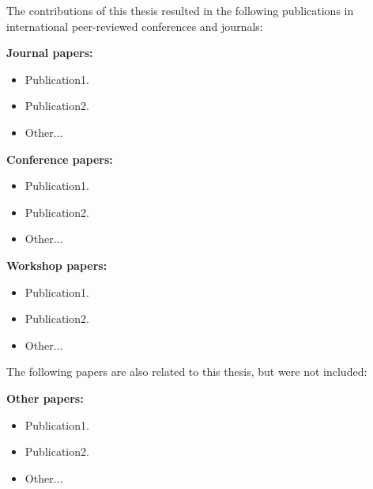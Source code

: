 \thispagestyle{plain}

The contributions of this thesis resulted in the following publications in international peer-reviewed conferences and journals:

\textbf{Journal papers:}
\begin{itemize}
	\item Publication1.
	\item Publication2.	
	\item Other...		
\end{itemize}

\textbf{Conference papers:}
\begin{itemize}
	\item Publication1.
	\item Publication2.	
	\item Other...		
\end{itemize}


\textbf{Workshop papers:}
\begin{itemize}
	\item Publication1.
	\item Publication2.	
	\item Other...		
\end{itemize}

The following papers are also related to this thesis, but were not included:

\textbf{Other papers:}
\begin{itemize}
	\item Publication1.
	\item Publication2.	
	\item Other...		
\end{itemize}